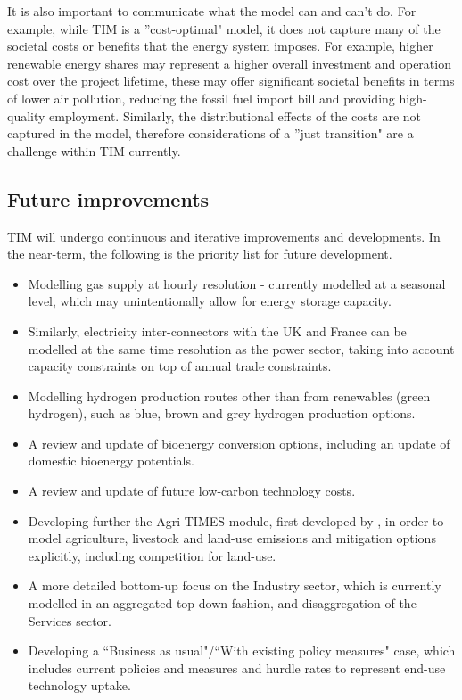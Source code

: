 \documentclass[gmd,manuscript]{copernicus}
\begin{document}
It is also important to communicate what the model can and can't do. For example, while TIM is a ''cost-optimal" model, it does not capture many of the societal costs or benefits that the energy system imposes. For example, higher renewable energy shares may represent a higher overall investment and operation cost over the project lifetime, these may offer significant societal benefits in terms of lower air pollution, reducing the fossil fuel import bill and providing high-quality employment. Similarly, the distributional effects of the costs are not captured in the model, therefore considerations of a ''just transition" are a challenge within TIM currently. 

\subsection{Future improvements}
TIM will undergo continuous and iterative improvements and developments. In the near-term, the following is the priority list for future development.
\begin{itemize}
 \item Modelling gas supply at hourly resolution - currently modelled at a seasonal level, which may unintentionally allow for energy storage capacity.
 \item Similarly, electricity inter-connectors with the UK and France can be modelled at the same time resolution as the power sector, taking into account capacity constraints on top of annual trade constraints.
 \item Modelling hydrogen production routes other than from renewables (green hydrogen), such as blue, brown and grey hydrogen production options. 
 \item A review and update of bioenergy conversion options, including an update of domestic bioenergy potentials. 
 \item A review and update of future low-carbon technology costs.
 \item Developing further the Agri-TIMES module, first developed by \citet{Chiodi2016}, in order to model agriculture, livestock and land-use emissions and mitigation options explicitly, including competition for land-use.
 \item A more detailed bottom-up focus on the Industry sector, which is currently modelled in an aggregated top-down fashion, and disaggregation of the Services sector.
 \item Developing a ``Business as usual"/``With existing policy measures" case, which includes current policies and measures and hurdle rates to represent end-use technology uptake.
\end{itemize}
\end{document}
